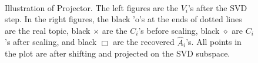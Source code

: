 \begin{figure}[h]
     \begin{center}

        \\ 

    \end{center}
{\small
    \caption{Illustration of Projector. The left figures are the $V_i$'s after the SVD step. In the right figures, the black 'o's at the ends of dotted lines are the real topic, black $\times$ are the $C_i$'s before scaling, black $\diamond$ are $C_i$'s after scaling, and black $\Box$ are the recovered $\hat{A}_i$'s. All points in the plot are after shifting and projected on the SVD subspace. }
}
   \label{fig:subfigures}
\end{figure}


